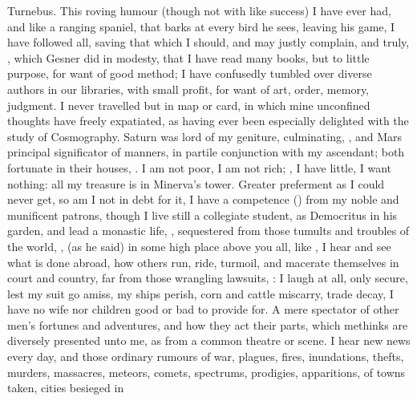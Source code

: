{Turnebus. This roving humour (though not with like success) I have ever
had, and like a ranging spaniel, that barks at every bird he sees,
leaving his game, I have followed all, saving that which I should, and
may justly complain, and truly, , which
Gesner did in modesty, that I have read many books, but to little
purpose, for want of good method; I have confusedly tumbled over diverse
authors in our libraries, with small profit, for want of art, order,
memory, judgment. I never travelled but in map or card, in which mine
unconfined thoughts have freely expatiated, as having ever been
especially delighted with the study of Cosmography. Saturn was lord
of my geniture, culminating, \etc, and Mars principal significator of
manners, in partile conjunction with my ascendant; both fortunate in
their houses, \etc. I am not poor, I am not rich; ,
I have little, I want nothing: all my treasure is in Minerva's tower.
Greater preferment as I could never get, so am I not in debt for it, I
have a competence () from my noble and munificent patrons,
though I live still a collegiate student, as Democritus in his garden,
and lead a monastic life, , sequestered from those
tumults and troubles of the world, ,
(as he said) in some high place above you all, like , I hear and see what is done abroad, how others run, ride,
turmoil, and macerate themselves in court and country, far from those
wrangling lawsuits, : I laugh at all, only secure, lest my suit go amiss, my ships
perish, corn and cattle miscarry, trade decay, I have no wife nor
children good or bad to provide for. A mere spectator of other men's
fortunes and adventures, and how they act their parts, which methinks
are diversely presented unto me, as from a common theatre or scene. I
hear new news every day, and those ordinary rumours of war, plagues,
fires, inundations, thefts, murders, massacres, meteors, comets,
spectrums, prodigies, apparitions, of towns taken, cities besieged in
}
